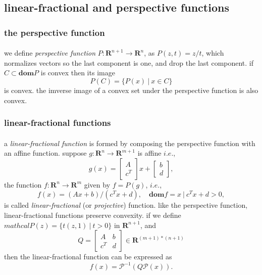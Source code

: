 \documentclass{article}
\begin{document}
  \subsection{linear-fractional and perspective functions}
    \subsubsection{the perspective function}
      \paragraph{} we define \textit{perspective function} $P : \mathbf{R}^{n + 1} \to \mathbf{R}^{n}$, as $P(z, t) = z / t$, which normalizes vectors so the last component is one, and drop the last component. if $C \subset \mathbf{dom} P$ is convex then its image
      \begin{equation}
        P(C) = \{P(x)\ |\ x \in C\}
      \end{equation}
      is convex. the imverse image of a convex set under the perspective function is also convex.
    \subsubsection{linear-fractional functions}
      \paragraph{} a \textit{linear-fractional function} is formed by composing the perspective function with an affine function. suppose $g : \mathbf{R}^n \to \mathbf{R}^{m + 1}$ is affine $i.e.$,
      \begin{equation}
        g(x) =
        \begin{bmatrix}
          A \\
          c^T
        \end{bmatrix}
        x +
        \begin{bmatrix}
          b \\
          d
        \end{bmatrix},
      \end{equation}
      the function $f: \mathbf{R}^n \to \mathbf{R}^m$ given by $f = P(g)$, $i.e.$,
      \begin{equation}
        f(x) = (Ax + b) / (c^Tx + d),\quad \mathbf{dom} f = {x\ |\ c^Tx + d > 0},
      \end{equation}
      is called \textit{linear-fractional} (or \textit{projective}) function. like the perspective function, linear-fractional functions preserve convexity. if we define $mathcal{P}(z) = \{t(z, 1)\ |\ t > 0\}$ in $\mathbf{R}^{n + 1}$, and
      \begin{equation}
        Q =
        \begin{bmatrix}
          A   & b  \\
          c^T & d
        \end{bmatrix}
        \in \mathbf{R}^{(m + 1) * (n + 1)}
      \end{equation}
      then the linear-fractional function can be expressed as
      \begin{equation}
        f(x) = \mathcal{P}^{-1}(Q\mathcal{P}(x)).
      \end{equation}
\end{document}
